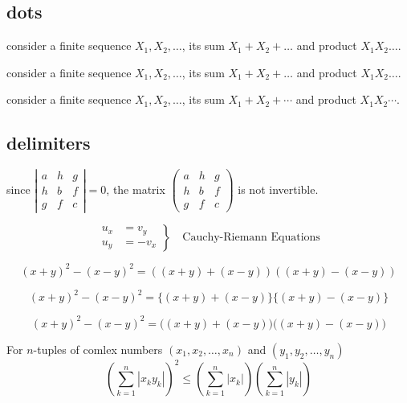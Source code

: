 \documentclass[a4paper, UTF8]{article}
\begin{document}
\subsection{dots}
consider a finite sequence $X_1,X_2,\dots$, its sum $X_1+X_2+\dots$ and product $X_1X_2\dots$.

consider a finite sequence $X_1,X_2,\dots$, its sum $X_1+X_2+\dots$ and product $X_1X_2\dots$.

consider a finite sequence $X_1,X_2,\dotsc$, its sum $X_1+X_2+\dotsb$ and product $X_1X_2\dotsm$.

\subsection{delimiters}
since 
$
\left|
\begin{smallmatrix}
    a & h & g\\
    h & b & f\\
    g & f & c
\end{smallmatrix}
\right|
=0
$,
the matrix
$
\left(
\begin{smallmatrix}
    a & h & g\\
    h & b & f\\
    g & f & c
\end{smallmatrix}   
\right)
$
is not invertible.

\begin{equation*}
    \left.
    \begin{aligned}
        u_x & =v_y\\
        u_y & = -v_x
    \end{aligned}
    \right\}
    \quad\text{Cauchy-Riemann Equations}
\end{equation*}

\begin{equation*}
    (x+y)^2-(x-y)^2=\left((x+y)+(x-y)\right)\left((x+y)-(x-y)\right)
\end{equation*}

\begin{equation*}
    (x+y)^2-(x-y)^2=\{(x+y)+(x-y)\}\{(x+y)-(x-y)\}
\end{equation*}

\begin{equation*}
    (x+y)^2-(x-y)^2=\bigl((x+y)+(x-y)\bigr)\bigl((x+y)-(x-y)\bigr)
\end{equation*}

For $n$-tuples of comlex numbers $(x_1,x_2,\dotsc,x_n)$ and $(y_1,y_2,\dotsc,y_n)$
\begin{equation*}
    \left(
    \sum_{k=1}^{n}|x_{k}y_{k}|
    \right)^2
    \le
    \left(
    \sum_{k=1}^{n}|x_{k}|    
    \right)
    \left(
    \sum_{k=1}^{n}|y_{k}|    
    \right)
\end{equation*}
\end{document}
